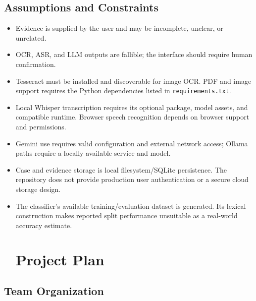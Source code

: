 \documentclass[12pt,a4paper,oneside]{report}
\begin{document}
\section{Assumptions and Constraints}
\begin{itemize}
\item Evidence is supplied by the user and may be incomplete, unclear, or unrelated.
\item OCR, ASR, and LLM outputs are fallible; the interface should require human confirmation.
\item Tesseract must be installed and discoverable for image OCR. PDF and image support requires the Python dependencies listed in \texttt{requirements.txt}.
\item Local Whisper transcription requires its optional package, model assets, and compatible runtime. Browser speech recognition depends on browser support and permissions.
\item Gemini use requires valid configuration and external network access; Ollama paths require a locally available service and model.
\item Case and evidence storage is local filesystem/SQLite persistence. The repository does not provide production user authentication or a secure cloud storage design.
\item The classifier's available training/evaluation dataset is generated. Its lexical construction makes reported split performance unsuitable as a real-world accuracy estimate.
\clearpage\chapter{Project Plan}
\end{itemize}
\section{Team Organization}
\end{document}
